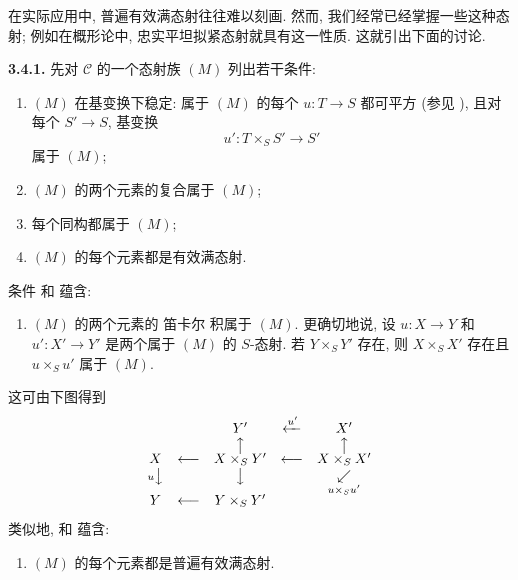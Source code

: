 在实际应用中, 普遍有效满态射往往难以刻画.
然而, 我们经常已经掌握一些这种态射;
例如在概形论中, 忠实平坦拟紧态射就具有这一性质.
这就引出下面的讨论.

\medskip
\noindent{}\textbf{3.4.1.}
先对 \(\mathscr C\) 的一个态射族 \((M)\) 列出若干条件:
\begin{enumerate}
  \item[(a)]
  \((M)\) 在基变换下稳定: 属于 \((M)\) 的每个 \(u:T\to S\)
  都可平方 (参见 ),
  且对每个 \(S'\to S\), 基变换
  \[
    u':T\times_S S'\longrightarrow S'
  \]
  属于 \((M)\);
  \item[(b)]
  \((M)\) 的两个元素的复合属于 \((M)\);
  \item[(c)]
  每个同构都属于 \((M)\);
  \item[(d)]
  \((M)\) 的每个元素都是有效满态射.
\end{enumerate}

条件  和
 蕴含:
\begin{enumerate}
  \item[(a$'$)]
  \((M)\) 的两个元素的 笛卡尔 积属于 \((M)\).
  更确切地说, 设 \(u:X\to Y\) 和 \(u':X'\to Y'\)
  是两个属于 \((M)\) 的 \(S\)-态射. 若 \(Y\times_S Y'\) 存在,
  则 \(X\times_S X'\) 存在且 \(u\times_Su'\) 属于 \((M)\).
\end{enumerate}

这可由下图得到
\[
\begin{array}{ccccc}
  &&Y'&\xleftarrow{u'}&X'\\
  &&\big\uparrow&&\big\uparrow\\[-2pt]
  X&\longleftarrow&X\times_S Y'&\longleftarrow&X\times_S X'\\
  {\scriptstyle u}\big\downarrow&&\big\downarrow&&
    \underset{\scriptstyle u\times_Su'}{\swarrow}\\[-2pt]
  Y&\longleftarrow&Y\times_S Y'&&
\end{array}
\]
类似地,  和
 蕴含:
\begin{enumerate}
  \item[(d$'$)]
  \((M)\) 的每个元素都是普遍有效满态射.
\end{enumerate}

